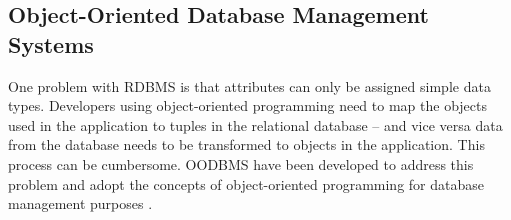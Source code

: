 
\subsection{Object-Oriented Database Management Systems} %
\label{sub:object_oriented_database_management_systems}

One problem with RDBMS is that attributes can only be assigned simple data types. Developers using object-oriented programming need to map the objects used in the application to tuples in the relational database -- and vice versa data from the database needs to be transformed to objects in the application. This process can be cumbersome. OODBMS have been developed to address this problem and adopt the concepts of object-oriented programming for database management purposes \cite{oodbms}.

